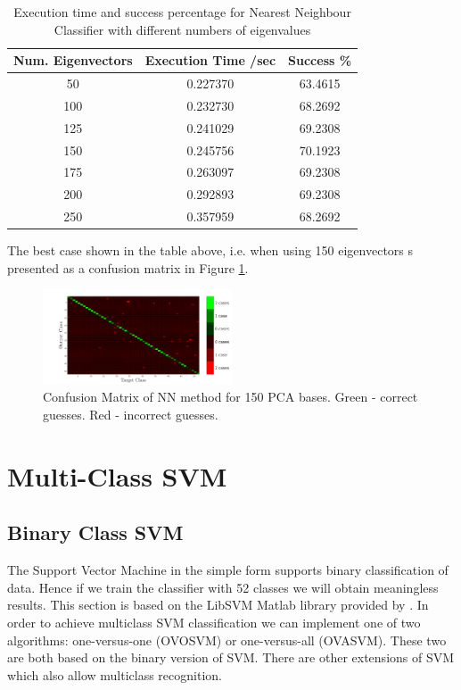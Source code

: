 \documentclass[10pt,twocolumn,letterpaper]{article}
\begin{document}
\begin{table}[H]
\begin{center}
\small
\begin{tabular}{||c c c||}
\hline
\bf Num. Eigenvectors & \bf Execution Time /sec & \bf Success \%\\ [0.5ex]
\hline \hline
50 & 0.227370 & 63.4615 \\ [0.5ex]
\hline
100 & 0.232730 & 68.2692 \\ [0.5ex]
\hline
125 & 0.241029 & 69.2308 \\ [0.5ex]
\hline
150 & 0.245756 & 70.1923 \\ [0.5ex]
\hline
175 & 0.263097 & 69.2308 \\ [0.5ex]
\hline
200 & 0.292893 & 69.2308 \\ [0.5ex]
\hline
250 & 0.357959 & 68.2692 \\ [0.5ex]
\hline
\end{tabular}
\end{center}
\caption{Execution time and success percentage for Nearest Neighbour Classifier with different numbers of eigenvalues} \label{tab:NN_table}
\end{table}

The best case shown in the table above, i.e. when using 150 eigenvectors s presented as a confusion matrix in Figure \ref{fig:confNN}.

\begin{figure}[H]
\begin{center}
  
    \includegraphics[width=0.5\textwidth]{../results/Q2B_NN_confusion}

  \caption{Confusion Matrix of NN method for 150 PCA bases. Green - correct guesses. Red - incorrect guesses. \label{fig:confNN}}

\end{center}
\end{figure}

\section{Multi-Class SVM}
\subsection{Binary Class SVM}
The Support Vector Machine in the simple form supports binary classification of data. Hence if we train the classifier with 52 classes we will obtain meaningless results. This section is based on the LibSVM Matlab library provided by \cite{LibSVM}. In order to achieve multiclass SVM classification we can implement one of two algorithms: one-versus-one (OVOSVM) or one-versus-all (OVASVM). These two are both based on the binary version of SVM. There are other extensions of SVM which also allow multiclass recognition.
\end{document}
